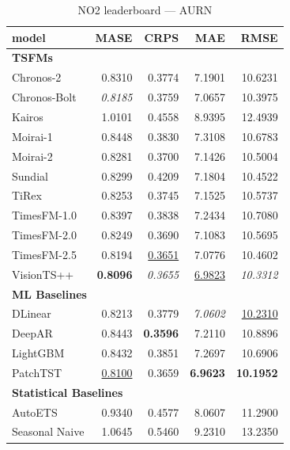 \begin{table}[H]
\caption{NO2 leaderboard --- AURN}
\centering
\begin{small}
\begin{tabular}{lrrrr}
\toprule
model & MASE & CRPS & MAE & RMSE \\
\midrule
\multicolumn{5}{l}{\textbf{TSFMs}} \\
Chronos-2 & 0.8310 & 0.3774 & 7.1901 & 10.6231 \\
Chronos-Bolt & \textit{0.8185} & 0.3759 & 7.0657 & 10.3975 \\
Kairos & 1.0101 & 0.4558 & 8.9395 & 12.4939 \\
Moirai-1 & 0.8448 & 0.3830 & 7.3108 & 10.6783 \\
Moirai-2 & 0.8281 & 0.3700 & 7.1426 & 10.5004 \\
Sundial & 0.8299 & 0.4209 & 7.1804 & 10.4522 \\
TiRex & 0.8253 & 0.3745 & 7.1525 & 10.5737 \\
TimesFM-1.0 & 0.8397 & 0.3838 & 7.2434 & 10.7080 \\
TimesFM-2.0 & 0.8249 & 0.3690 & 7.1083 & 10.5695 \\
TimesFM-2.5 & 0.8194 & \underline{0.3651} & 7.0776 & 10.4602 \\
VisionTS++ & \textbf{0.8096} & \textit{0.3655} & \underline{6.9823} & \textit{10.3312} \\
\midrule
\multicolumn{5}{l}{\textbf{ML Baselines}} \\
DLinear & 0.8213 & 0.3779 & \textit{7.0602} & \underline{10.2310} \\
DeepAR & 0.8443 & \textbf{0.3596} & 7.2110 & 10.8896 \\
LightGBM & 0.8432 & 0.3851 & 7.2697 & 10.6906 \\
PatchTST & \underline{0.8100} & 0.3659 & \textbf{6.9623} & \textbf{10.1952} \\
\midrule
\multicolumn{5}{l}{\textbf{Statistical Baselines}} \\
AutoETS & 0.9340 & 0.4577 & 8.0607 & 11.2900 \\
Seasonal Naive & 1.0645 & 0.5460 & 9.2310 & 13.2350 \\
\bottomrule
\end{tabular}
\end{small}
\end{table}